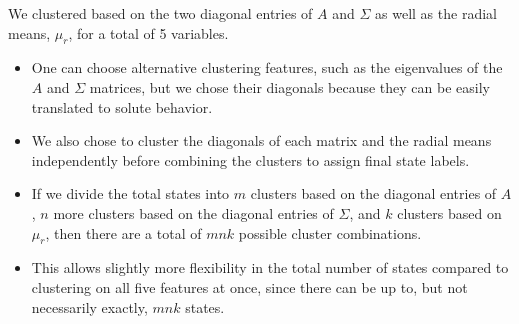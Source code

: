 \documentclass{article}
\begin{document}
  We clustered based on the two diagonal entries of $A$ and $\Sigma$ as well as the
  radial means, $\mu_r$, for a total of 5 variables.
  \begin{itemize}
   \item One can choose alternative clustering features, such as the eigenvalues of
   the $A$ and $\Sigma$ matrices, but we chose their diagonals because they can be
   easily translated to solute behavior.
   \item We also chose to cluster the diagonals of each matrix and the radial means
   independently before combining the clusters to assign final state labels. 
   \item If we divide the total states into $m$ clusters based on the diagonal entries
   of $A$, $n$ more clusters based on the diagonal entries of $\Sigma$, and $k$ clusters
   based on $\mu_r$, then there are a total of $mnk$ possible cluster combinations.
   \item This allows slightly more flexibility in the total number of states compared
   to clustering on all five features at once, since there can be up to, but not 
   necessarily exactly, $mnk$ states. 
  \end{itemize} 
  
\end{document}
